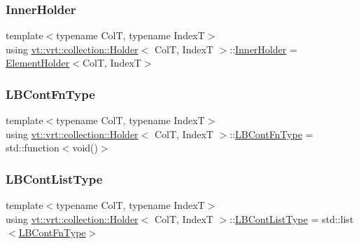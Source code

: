 \subsubsection{\texorpdfstring{Inner\+Holder}{InnerHolder}}
{\footnotesize\ttfamily template$<$typename ColT, typename IndexT$>$ \\
using \hyperlink{structvt_1_1vrt_1_1collection_1_1_holder}{vt\+::vrt\+::collection\+::\+Holder}$<$ ColT, IndexT $>$\+::\hyperlink{structvt_1_1vrt_1_1collection_1_1_holder_aafc9b515450179bad7f03e17010b59f8}{Inner\+Holder} =  \hyperlink{structvt_1_1vrt_1_1collection_1_1_element_holder}{Element\+Holder}$<$ColT, IndexT$>$}

\mbox{\label{structvt_1_1vrt_1_1collection_1_1_holder_a01812f8ee06d3a67e1a9aa2765989913}} 
\subsubsection{\texorpdfstring{L\+B\+Cont\+Fn\+Type}{LBContFnType}}
{\footnotesize\ttfamily template$<$typename ColT, typename IndexT$>$ \\
using \hyperlink{structvt_1_1vrt_1_1collection_1_1_holder}{vt\+::vrt\+::collection\+::\+Holder}$<$ ColT, IndexT $>$\+::\hyperlink{structvt_1_1vrt_1_1collection_1_1_holder_a01812f8ee06d3a67e1a9aa2765989913}{L\+B\+Cont\+Fn\+Type} =  std\+::function$<$void()$>$}

\mbox{\label{structvt_1_1vrt_1_1collection_1_1_holder_af26a59243dd4e1a86d8fcf320a8dc463}} 
\subsubsection{\texorpdfstring{L\+B\+Cont\+List\+Type}{LBContListType}}
{\footnotesize\ttfamily template$<$typename ColT, typename IndexT$>$ \\
using \hyperlink{structvt_1_1vrt_1_1collection_1_1_holder}{vt\+::vrt\+::collection\+::\+Holder}$<$ ColT, IndexT $>$\+::\hyperlink{structvt_1_1vrt_1_1collection_1_1_holder_af26a59243dd4e1a86d8fcf320a8dc463}{L\+B\+Cont\+List\+Type} =  std\+::list$<$\hyperlink{structvt_1_1vrt_1_1collection_1_1_holder_a01812f8ee06d3a67e1a9aa2765989913}{L\+B\+Cont\+Fn\+Type}$>$}

